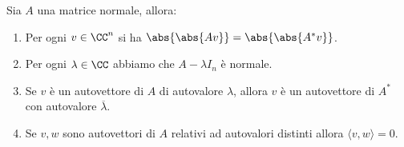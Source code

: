 \documentclass[11pt]{scrartcl}
\begin{document}
   	 \begin{proposition}
   	 	Sia $A$ una matrice normale, allora:
   	 	\begin{enumerate}
   	 		\item Per ogni $v\in\CC^n$ si ha $\abs{\abs{A v}}=\abs{\abs{A^*v}}$.
   	 		\item Per ogni $\lambda\in \CC$ abbiamo che $A-\lambda I_n$ è normale.
   	 		\item Se $v$ è un autovettore di $A$ di autovalore $\lambda$, allora $v$ è un autovettore di $A^*$ con autovalore $\overline{\lambda}$.
   	 		\item Se $v,w$ sono autovettori di $A$ relativi ad autovalori distinti allora $\langle v,w\rangle =0$. 
   	 	\end{enumerate}
   	 \end{proposition}
\end{document}
